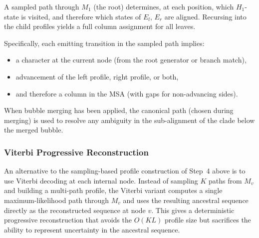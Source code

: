 A sampled path through $M_1$ (the root) determines, at each position,
which $H_1$-state is visited, and therefore which states of $E_l$, $E_r$ are aligned.
Recursing into the child profiles yields a full column assignment for all leaves.

Specifically, each emitting transition in the sampled path implies:
\begin{itemize}
\item a character at the current node (from the root generator or branch match),
\item advancement of the left profile, right profile, or both,
\item and therefore a column in the MSA (with gaps for non-advancing sides).
\end{itemize}

When bubble merging has been applied, the canonical path
(chosen during merging) is used to resolve any ambiguity in the
sub-alignment of the clade below the merged bubble.

\subsubsection{Viterbi Progressive Reconstruction}

An alternative to the sampling-based profile construction of Step~4 above
is to use Viterbi decoding at each internal node.
Instead of sampling $K$ paths from $M_v$ and building a multi-path profile,
the Viterbi variant computes a single maximum-likelihood path through
$M_v$ and uses the resulting ancestral sequence directly as the
reconstructed sequence at node $v$.
This gives a deterministic progressive reconstruction that avoids
the $O(KL)$ profile size but sacrifices the ability to represent
uncertainty in the ancestral sequence.
